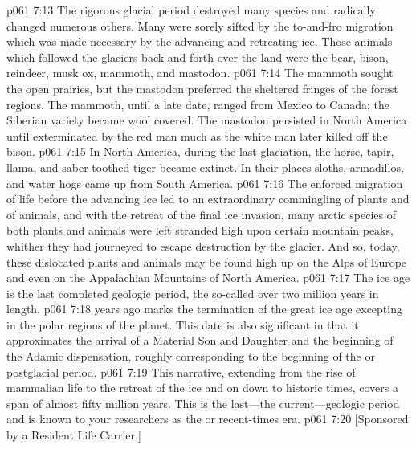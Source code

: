 \vs p061 7:13 The rigorous glacial period destroyed many species and radically changed numerous others. Many were sorely sifted by the to\hyp{}and\hyp{}fro migration which was made necessary by the advancing and retreating ice. Those animals which followed the glaciers back and forth over the land were the bear, bison, reindeer, musk ox, mammoth, and mastodon.
\vs p061 7:14 The mammoth sought the open prairies, but the mastodon preferred the sheltered fringes of the forest regions. The mammoth, until a late date, ranged from Mexico to Canada; the Siberian variety became wool covered. The mastodon persisted in North America until exterminated by the red man much as the white man later killed off the bison.
\vs p061 7:15 In North America, during the last glaciation, the horse, tapir, llama, and saber\hyp{}toothed tiger became extinct. In their places sloths, armadillos, and water hogs came up from South America.
\vs p061 7:16 The enforced migration of life before the advancing ice led to an extraordinary commingling of plants and of animals, and with the retreat of the final ice invasion, many arctic species of both plants and animals were left stranded high upon certain mountain peaks, whither they had journeyed to escape destruction by the glacier. And so, today, these dislocated plants and animals may be found high up on the Alps of Europe and even on the Appalachian Mountains of North America.\plusone
\pc \vs p061 7:17 The ice age is the last completed geologic period, the so\hyp{}called  over two million years in length.
\pc \vs p061 7:18  years ago marks the termination of the great ice age excepting in the polar regions of the planet. This date is also significant in that it approximates the arrival of a Material Son and Daughter and the beginning of the Adamic dispensation, roughly corresponding to the beginning of the  or postglacial period.
\pc \vs p061 7:19 This narrative, extending from the rise of mammalian life to the retreat of the ice and on down to historic times, covers a span of almost fifty million years. This is the last---the current---geologic period and is known to your researchers as the  or recent\hyp{}times era.
\vsetoff
\vs p061 7:20 [Sponsored by a Resident Life Carrier.]
